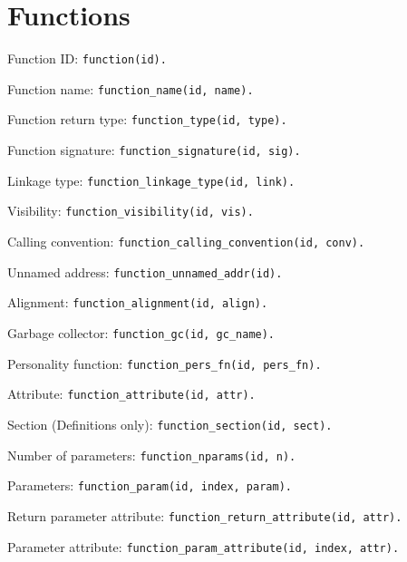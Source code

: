 \section{Functions} %
\noindent Function ID:
\texttt{function(id).}

\noindent Function name:
\texttt{function\_name(id, name).}

\noindent Function return type:
\texttt{function\_type(id, type).}

\noindent Function signature:
\texttt{function\_signature(id, sig).}

\noindent Linkage type:
\texttt{function\_linkage\_type(id, link).}

\noindent Visibility:
\texttt{function\_visibility(id, vis).}

\noindent Calling convention:
\texttt{function\_calling\_convention(id, conv).}

\noindent Unnamed address:
\texttt{function\_unnamed\_addr(id).}

\noindent Alignment:
\texttt{function\_alignment(id, align).}

\noindent Garbage collector:
\texttt{function\_gc(id, gc\_name).}

\noindent Personality function:
\texttt{function\_pers\_fn(id, pers\_fn).}

\noindent Attribute:
\texttt{function\_attribute(id, attr).}

\noindent Section (Definitions only):
\texttt{function\_section(id, sect).}

\noindent Number of parameters:
\texttt{function\_nparams(id, n).}

\noindent Parameters:
\texttt{function\_param(id, index, param).}

\noindent Return parameter attribute:
\texttt{function\_return\_attribute(id, attr).}

\noindent Parameter attribute:
\texttt{function\_param\_attribute(id, index, attr).}

